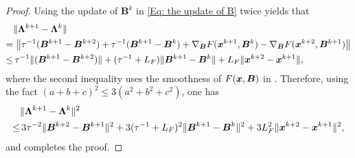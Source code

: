 \begin{proof}
    Using the update of $\bm{B}^{k}$ in \eqref{Eq: the update of B} twice yields that
\begin{align*}
    &\|\bm{\Lambda}^{k+1}- \bm{\Lambda}^{k}\| \notag \\
    =&\, \left\| \tau^{-1}(\bm{B}^{k+1}- \bm{B}^{k+2}) + \tau^{-1}(\bm{B}^{k+1}- \bm{B}^{k}) + \nabla_{\bm{B}}F(\bm{x}^{k+1}, \bm{B}^{k}) - \nabla_{\bm{B}}F(\bm{x}^{k+2}, \bm{B}^{k+1}) \right\| \\
    \leq&\, \tau^{-1}\|(\bm{B}^{k+1}- \bm{B}^{k+2})\| + (\tau^{-1}+ L_{F}) \|\bm{B}^{k+1}- \bm{B}^{k}\| + L_{F}\|\bm{x}^{k+2}- \bm{x}^{k+1}\|,
\end{align*}
    where the second inequality uses the smoothness of $F(\bm{x}, \bm{B})$ in . Therefore, using the fact $(a + b + c)^{2}\leq 3(a^{2}+ b^{2}+c^{2})$, one has
    \begin{align}
         &\|\bm{\Lambda}^{k+1}- \bm{\Lambda}^{k}\|^{2} \notag \\
         \leq&\, 3\tau^{-2}\|\bm{B}^{k+2}- \bm{B}^{k+1}\|^{2}+ 3(\tau^{-1}+ L_{F})^{2}\|\bm{B}^{k+1}- \bm{B}^{k}\|^{2} + 3L_{F}^{2}\|\bm{x}^{k+2}- \bm{x}^{k+1}\|^{2},\label{Eq: dual boundedness in proof}
    \end{align}
    and completes the proof. 
\end{proof}

